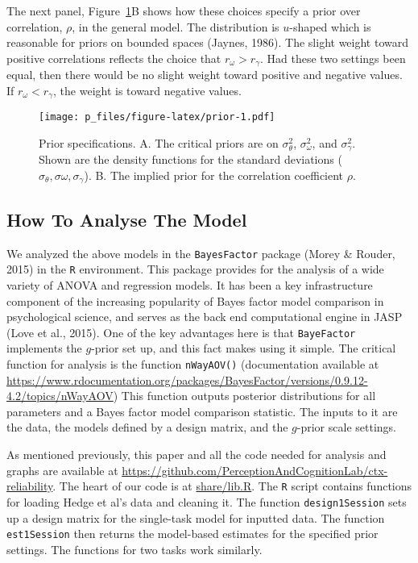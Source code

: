 \documentclass[english,man]{apa6}
\theoremstyle{definition}
\theoremstyle{definition}
\theoremstyle{definition}
\theoremstyle{remark}
\begin{document}
The next panel, Figure~\ref{fig:prior}B shows how these choices specify
a prior over correlation, \(\rho\), in the general model. The
distribution is \(u\)-shaped which is reasonable for priors on bounded
spaces (Jaynes, 1986). The slight weight toward positive correlations
reflects the choice that \(r_\omega>r_\gamma\). Had these two settings
been equal, then there would be no slight weight toward positive and
negative values. If \(r_\omega<r_\gamma\), the weight is toward negative
values.

\begin{figure}[htbp]
\centering
\texttt{[image: p\_files/figure-latex/prior-1.pdf]}
\caption{\label{fig:prior}Prior specifications. A. The critical priors are
on \(\sigma^2_\theta\), \(\sigma^2_\omega\), and \(\sigma^2_\gamma\).
Shown are the density functions for the standard deviations
(\(\sigma_\theta, \sigma\omega, \sigma_\gamma\)). B. The implied prior
for the correlation coefficient \(\rho\).}
\end{figure}

\subsection{How To Analyse The Model}\label{how-to-analyse-the-model}

We analyzed the above models in the \texttt{BayesFactor} package (Morey
\& Rouder, 2015) in the \texttt{R} environment. This package provides
for the analysis of a wide variety of ANOVA and regression models. It
has been a key infrastructure component of the increasing popularity of
Bayes factor model comparison in psychological science, and serves as
the back end computational engine in JASP (Love et al., 2015). One of
the key advantages here is that \texttt{BayeFactor} implements the
\(g\)-prior set up, and this fact makes using it simple. The critical
function for analysis is the function \texttt{nWayAOV()} (documentation
available at
\url{https://www.rdocumentation.org/packages/BayesFactor/versions/0.9.12-4.2/topics/nWayAOV})
This function outputs posterior distributions for all parameters and a
Bayes factor model comparison statistic. The inputs to it are the data,
the models defined by a design matrix, and the \(g\)-prior scale
settings.

As mentioned previously, this paper and all the code needed for analysis
and graphs are available at
\url{https://github.com/PerceptionAndCognitionLab/ctx-reliability}. The
heart of our code is at
\href{https://github.com/PerceptionAndCognitionLab/ctx-reliability/blob/public/share/lib.R}{share/lib.R}.
The \texttt{R} script contains functions for loading Hedge et al's data
and cleaning it. The function \texttt{design1Session} sets up a design
matrix for the single-task model for inputted data. The function
\texttt{est1Session} then returns the model-based estimates for the
specified prior settings. The functions for two tasks work similarly.
\end{document}
